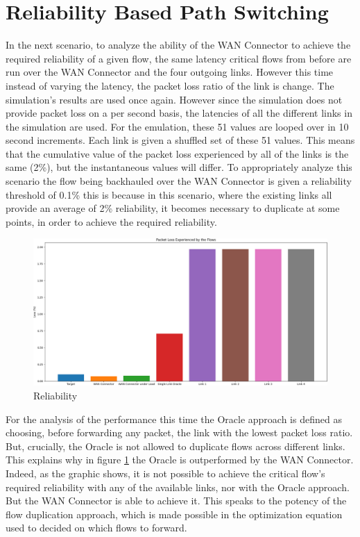 \section{Reliability Based Path Switching}

In the next scenario, to analyze the ability of the WAN Connector to achieve the required reliability of a given flow, the same latency critical flows from before are run over the WAN Connector and the four outgoing links. However this time instead of varying the latency, the packet loss ratio of the link is change. The simulation's results are used once again. However since the simulation does not provide packet loss on a per second basis, the latencies of all the different links in the simulation are used. For the emulation, these 51 values are looped over in 10 second increments. Each link is given a shuffled set of these 51 values. This means that the cumulative value of the packet loss experienced by all of the links is the same (2\%), but the instantaneous values will differ. To appropriately analyze this scenario the flow being backhauled over the WAN Connector is given a reliability threshold of 0.1\% this is because in this scenario, where the existing links all provide an average of 2\% reliability, it becomes necessary to duplicate at some points, in order to achieve the required reliability. 

\begin{figure}[h]
    \centering
        \includegraphics[height=0.66\textwidth,width=\textwidth]{fig/loss_bars1.png}
        \caption{Reliability}
        \label{fig:loss_bars1}
\end{figure}

For the analysis of the performance this time the Oracle approach is defined as choosing, before forwarding any packet, the link with the lowest packet loss ratio. But, crucially, the Oracle is not allowed to duplicate flows across different links. This explains why in figure \ref{fig:loss_bars1} the Oracle is outperformed by the WAN Connector. Indeed, as the graphic shows, it is not possible to achieve the critical flow's required reliability with any of the available links, nor with the Oracle approach. But the WAN Connector is able to achieve it. This speaks to the potency of the flow duplication approach, which is made possible in the optimization equation used to decided on which flows to forward.

